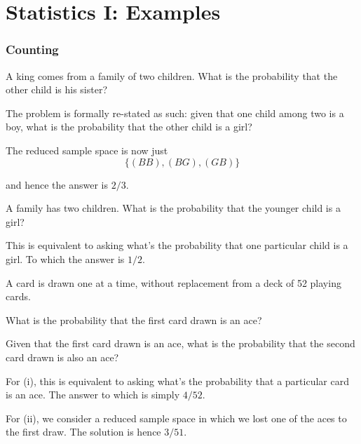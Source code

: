 \chapter{Statistics I: Examples}\label{fc5d59d}

\subsection{Counting}\label{bb61661}

\Example{}\label{dea0f9c}

A king comes from a family of two children. What is the probability that the
other child is his sister?

\begin{solution}
  The problem is formally re-stated as such: given that one child among two is a
  boy, what is the probability that the other child is a girl?

  The reduced sample space is now just
  $$
    \{(BB), (BG), (GB)\}
  $$

  and hence the answer is $2/3$.
\end{solution}

\Example{}\label{a2a8531}

A family has two children. What is the probability that the younger child is a
girl?

\begin{solution}
  This is equivalent to asking what's the probability that one particular child
  is a girl. To which the answer is $1/2$.
\end{solution}

\Example{}\label{c9b4b6d}

A card is drawn one at a time, without replacement from a deck of 52 playing
cards.

\begin{enumerati}
  \item What is the probability that the first card drawn is an ace?
  \item Given that the first card drawn is an ace, what is the probability that
        the second card drawn is also an ace?
\end{enumerati}

\begin{solution}
  For (i), this is equivalent to asking what's the probability that a particular
  card is an ace. The answer to which is simply $4/52$.

  For (ii), we consider a reduced sample space in which we lost one of the aces
  to the first draw. The solution is hence $3/51$.
\end{solution}

